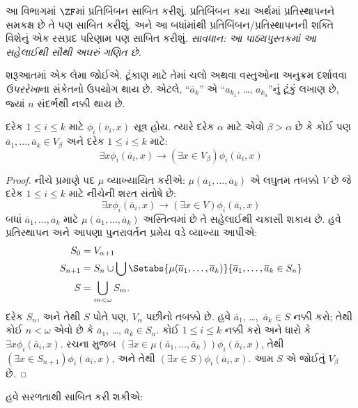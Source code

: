 \documentclass[../../../include/open-logic-section]{subfiles}
\begin{document}

આ વિભાગમાં $\ZF$માં પ્રતિબિંબન સાબિત કરીશું. પ્રતિબિંબન
કયા અર્થમાં પ્રતિસ્થાપનને સમકક્ષ છે તે પણ સાબિત કરીશું.
અને આ બધાંમાંથી પ્રતિબિંબન/પ્રતિસ્થાપનની શક્તિ વિશેનું
એક રસપ્રદ પરિણામ પણ સાબિત કરીશું. \emph{સાવધાન:
આ પાઠ્યપુસ્તકમાં આ સહેલાઈથી સૌથી અઘરું ગણિત છે.}

શરૂઆતમાં એક લેમા જોઈએ. ટૂંકાણ માટે તેમાં ચલો અથવા
વસ્તુઓના અનુક્રમ દર્શાવવા \emph{ઉપરરેખા}ના સંકેતનો
ઉપયોગ થાય છે. એટલે, ``$\overline{a}_k$'' એ
``$a_{k_1}$, \dots, $a_{k_n}$''નું ટૂંકું લખાણ છે,
જ્યાં $n$ સંદર્ભથી નક્કી થાય છે.

\begin{lem}
દરેક $1 \leq i \leq k$ માટે
$\phi_i(\overline{v}_i, x)$ સૂત્ર હોય. ત્યારે દરેક
$\alpha$ માટે એવો $\beta > \alpha$ છે કે કોઈ પણ
$\overline{a}_1, \ldots, \overline{a}_k \in V_\beta$
અને દરેક $1 \leq i \leq k$ માટે:
\[
	\exists x\phi_i(\overline{a}_i, x) \rightarrow (\exists x \in V_\beta) \phi_i(\overline{a}_i, x)
\]
\end{lem}

\begin{proof}
નીચે પ્રમાણે પદ $\mu$ વ્યાખ્યાયિત કરીએ:
$\mu(\overline{a}_1, \ldots,
\overline{a}_k)$ એ લઘુતમ તબક્કો $V$ છે જે દરેક
$1 \leq i \leq k$ માટે નીચેની શરત સંતોષે છે:
\[
\exists x\phi_i(\overline{a}_i, x) \rightarrow (\exists x \in V) \phi_i(\overline{a}_i, x)
\]
બધાં $\overline{a}_1, \ldots, \overline{a}_k$
માટે $\mu(\overline{a}_1, \ldots, \overline{a}_k)$
અસ્તિત્વમાં છે તે સહેલાઈથી ચકાસી શકાય છે. હવે
પ્રતિસ્થાપન અને આપણા પુનરાવર્તન પ્રમેય વડે વ્યાખ્યા આપીએ:
\begin{align*}
	S_0 & = V_{\alpha+1}\\
	S_{n+1} & = S_n \cup \bigcup
	\Setabs{\mu(\overline{a}_1, \ldots, \overline{a}_k)}
	{\overline{a}_1, \ldots, \overline{a}_k \in S_n} \\
	S &= \bigcup_{m < \omega} S_m.
\end{align*}
દરેક $S_n$, અને તેથી $S$ પોતે પણ, $V_\alpha$
પછીનો તબક્કો છે. હવે $\overline{a}_1$,
\dots,~$\overline{a}_k \in S$ નક્કી કરો; તેથી કોઈ
$n < \omega$ એવો છે કે $\overline{a}_1$,
\dots, $\overline{a}_k \in S_n$. કોઈ
$1 \leq i \leq k$ નક્કી કરો અને ધારો કે
$\exists x \phi_i(\overline{a}_i,x)$. રચના મુજબ
$(\exists x \in \mu(\overline{a}_1,
\ldots, \overline{a}_k))\phi_i(\overline{a}_i, x)$,
તેથી $(\exists x \in S_{n+1})\phi_i(\overline{a}_i, x)$,
અને તેથી $(\exists x \in S)\phi_i(\overline{a}_i, x)$.
આમ $S$ એ જોઈતું $V_\beta$ છે.
\end{proof}
\noindent
હવે  સરળતાથી
સાબિત કરી શકીએ:
\end{document}
